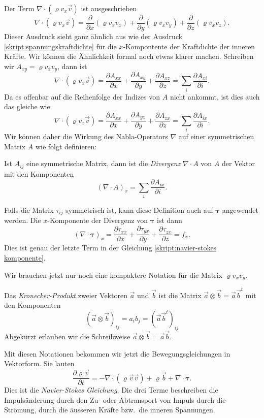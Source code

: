 Der Term $\nabla \cdot(\varrho v_x\vec{v})$ ist ausgeschrieben
\[
\nabla \cdot(\varrho v_x\vec{v})
=
\frac{\partial}{\partial x}
(\varrho v_xv_x)
+
\frac{\partial}{\partial y}
(\varrho v_xv_y)
+
\frac{\partial}{\partial z}
(\varrho v_xv_z).
\]
Dieser Ausdruck sieht ganz ähnlich aus wie der Ausdruck
\eqref{skript:spannungskraftdichte}
für die $x$-Kompontente der Kraftdichte der inneren Kräfte.
Wir können die Ähnlichkeit formal noch etwas klarer machen.
Schreiben wir $A_{xy} = \varrho v_xv_y$, dann ist
\[
\nabla \cdot(\varrho v_x\vec{v})
=
\frac{\partial A_{xx}}{\partial x}
+
\frac{\partial A_{xy}}{\partial y}
+
\frac{\partial A_{xz}}{\partial z}
=
\sum_{i}\frac{\partial A_{xi}}{\partial i}.
\]
Da es offenbar auf die Reihenfolge der Indizes von $A$ nicht ankommt,
ist dies auch das gleiche wie
\[
\nabla \cdot(\varrho v_x\vec{v})
=
\frac{\partial A_{xx}}{\partial x}
+
\frac{\partial A_{yx}}{\partial y}
+
\frac{\partial A_{zx}}{\partial z}
=
\sum_{i}\frac{\partial A_{ix}}{\partial i}.
\]
Wir können daher die Wirkung des Nabla-Operators $\nabla$ auf einer
symmetrischen Matrix $A$ wie folgt definieren:

\begin{definition}
\label{skript:definition divergenz}
Ist $A_{ij}$ eine symmetrische Matrix, dann ist die {\em Divergenz}
$\nabla\cdot A$
von
$A$ der Vektor mit den Komponenten
\[
(\nabla\cdot A)_x
=
\sum_{i}\frac{\partial A_{ix}}{\partial i}.
\]
\end{definition}
Falls die Matrix $\tau_{ij}$ symmetrisch ist, kann diese Definition
auch auf $\bm{\tau}$ angewendet werden.
Die $x$-Komponente der Divergenz von $\bm{\tau}$ ist dann
\[
(\nabla\cdot \bm{\tau})_x
=
\frac{\partial \tau_{xx}}{\partial x}
+
\frac{\partial \tau_{yx}}{\partial y}
+
\frac{\partial \tau_{zx}}{\partial z}
=
f_x.
\]
Dies ist genau der letzte Term in der Gleichung
\eqref{skript:navier-stokes komponente}.

Wir brauchen jetzt nur noch eine kompaktere Notation für die Matrix
$\varrho v_xv_y$.

\begin{definition}
Das {\em Kronecker-Produkt} zweier Vektoren $\vec{a}$ und $\vec{b}$ ist die
Matrix $\vec{a}\otimes\vec{b}=\vec{a}\vec{b}^t$ mit den Komponenten
\[
(\vec{a}\otimes\vec{b})_{ij}
=
a_ib_j
=
(
\vec{a}
\vec{b}^t
)_{ij}
\]
Abgekürzt erlauben wir die Schreibweise $\vec{a}\otimes\vec{b}=\vec{a}\vec{b}$.
\end{definition}

Mit diesen Notationen bekommen wir jetzt die Bewegungsgleichungen in
Vektorform.
Sie lauten
\begin{equation}
\frac{\partial \varrho\vec v}{\partial t}
=
-\nabla\cdot(\varrho\vec{v}\vec{v})
+ \varrho\vec{b}
+ \nabla\cdot \bm{\tau}.
\label{skript:navier-stokes1}
\end{equation}
Dies ist die {\em Navier-Stokes Gleichung}.
Die drei Terme beschreiben die Impulsänderung durch den Zu- oder Abtransport
von Impuls durch die Strömung, durch die äusseren Kräfte bzw.~die inneren
Spannungen.

